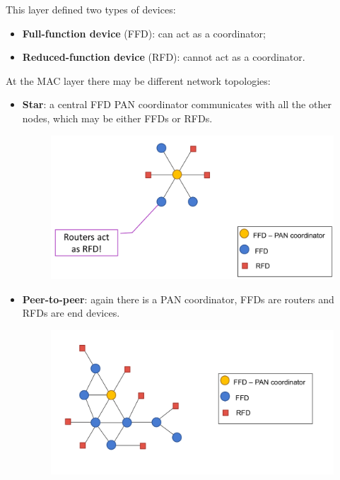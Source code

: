 This layer defined two types of devices:
\begin{itemize}
   \item \textbf{Full-function device} (FFD): can act as a coordinator;
   \item \textbf{Reduced-function device} (RFD): cannot act as a coordinator.
\end{itemize}


At the MAC layer there may be different network topologies:
\begin{itemize}
   \item \textbf{Star}: a central FFD PAN coordinator communicates with all the other nodes, which may be either FFDs or RFDs.
   \begin{figure}[htbp]
      \centering
      \includegraphics{images/802_star.png}
      \label{fig:802_star}
   \end{figure}
   \item \textbf{Peer-to-peer}: again there is a PAN coordinator, FFDs are routers and RFDs are end devices.
   \begin{figure}[htbp]
      \centering
      \includegraphics{images/802_p2p.png}
      \label{fig:802_p2p}
   \end{figure}
\end{itemize}
   
